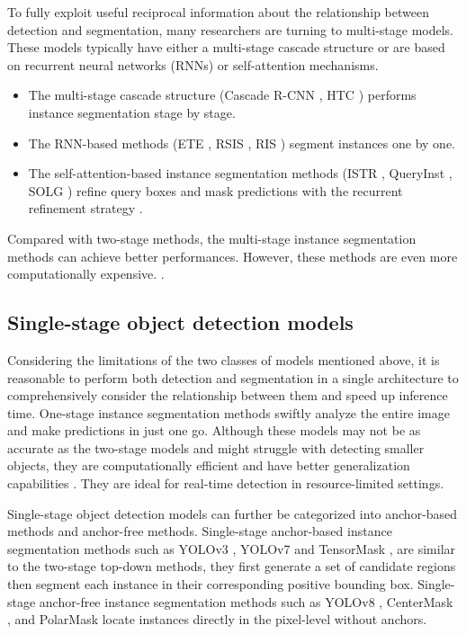 To fully exploit useful reciprocal information about the relationship between detection and segmentation, many researchers are turning to multi-stage models. These models typically have either a multi-stage cascade structure or are based on recurrent neural networks (RNNs) or self-attention mechanisms. 
\begin{itemize}
	\item The multi-stage cascade structure (Cascade R-CNN \cite{cai2019cascade}, HTC \cite{chen2019hybrid}) performs instance segmentation stage by stage. 
	\item The RNN-based methods (ETE \cite{ren2017end}, RSIS \cite{salvador2017recurrent}, RIS \cite{romera2016recurrent}) segment instances one by one.  
	\item The self-attention-based instance segmentation methods (ISTR \cite{hu2021istr}, QueryInst \cite{fang2021instances}, SOLG \cite{dong2021solq}) refine query boxes and mask predictions with the recurrent refinement strategy \cite{2dISreview}. 
\end{itemize}

Compared with two-stage methods, the multi-stage instance segmentation methods can achieve better performances. However, these methods are even more computationally expensive. \cite{2dISreview}.

\subsection{Single-stage object detection models}

Considering the limitations of the two classes of models mentioned above, it is reasonable to perform both detection and segmentation in a single architecture to comprehensively consider the relationship between them and speed up inference time. One-stage instance segmentation methods swiftly analyze the entire image and make predictions in just one go. Although these models may not be as accurate as the two-stage models and might struggle with detecting smaller objects, they are computationally efficient and have better generalization capabilities \cite{comprehensiveSeg}. They are ideal for real-time detection in resource-limited settings. 

Single-stage object detection models can further be categorized into anchor-based methods and anchor-free methods. Single-stage anchor-based instance segmentation methods such as YOLOv3 \cite{redmon2018yolov3}, YOLOv7 \cite{yolov7} and TensorMask \cite{chen2019tensormask}, are similar to the two-stage top-down methods, they first generate a set of candidate regions then segment each instance in their corresponding positive bounding box. Single-stage anchor-free instance segmentation methods such as YOLOv8 \cite{yolov8}, CenterMask \cite{lee2020centermask}, and PolarMask \cite{xie2020polarmask} locate instances directly in the pixel-level without anchors.

